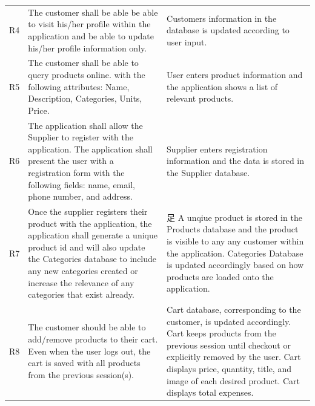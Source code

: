 \documentclass[12pt]{article}
\begin{document}
\begin{myspace}{1.7}
\begin{table}[]
\begin{tabular}{| p{.5cm}|p{9cm} |p{5cm}|}
R4  & The customer shall be able be able to visit his/her profile within the application and be able to update his/her profile information only.                                                                                                                                                             & Customers information in the database is updated according to user input.                                                                                                                                                                                                    \\
R5  & The customer shall be able to query products online. with the following attributes: Name, Description, Categories, Units, Price.                                                                                                                                                                       & User enters product information and the application shows a list of relevant products.                                                                                                                                                                                       \\
R6  & The application shall allow the Supplier to register with the application. The application shall present the user with a registration form with the following fields: name, email, phone number, and address.                                                                                          & Supplier enters registration information and the data is stored in the Supplier database.                                                                                                                                                                                    \\
R7  & Once the supplier registers their product with the application, the application shall generate a unique product id and will also update the Categories database to include any new categories created or increase the relevance of any categories that exist already.                                  & 足      A unqiue product is stored in the Products database and the product is visible to any any customer within the application. Categories Database is updated accordingly based on how products are loaded onto the application.                                          \\
R8  & The customer should be able to add/remove products to their cart. Even when the user logs out, the cart is saved with all products from the previous session(s).                                                                                                                                       & Cart database, corresponding to the customer, is updated accordingly. Cart keeps products from the previous session until checkout or explicitly removed by the user. Cart displays price, quantity, title, and image of each desired product. Cart displays total expenses. \\

\end{tabular}
\end{table}
\end{myspace}
\end{document}
